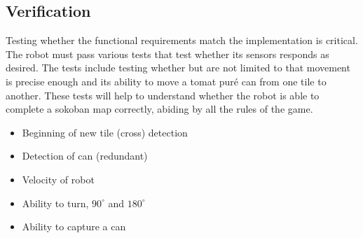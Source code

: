 \documentclass[../../main.tex]{subfiles}
\begin{document}
\subsection{Verification}%
\label{sub:verification}

Testing whether the functional requirements match the implementation is critical.
The robot must pass various tests that test whether its sensors responds as desired. The tests include testing whether but are not limited to that movement is precise enough and its ability to move a tomat puré can from one tile to another. These tests will help to understand whether the robot is able to complete a sokoban map correctly, abiding by all the rules of the game.

\begin{itemize}
	\item Beginning of new tile (cross) detection
	
	\item Detection of can (redundant)
	
	\item Velocity of robot
	
	\item Ability to turn, $90^{\circ}$ and $180^{\circ}$
	
	\item Ability to capture a can
\end{itemize}


	
\end{document}
